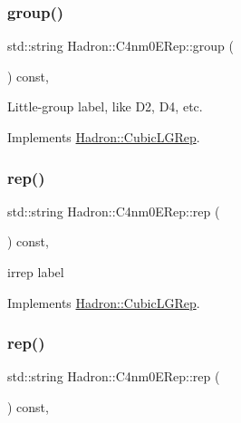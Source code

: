 \subsubsection{\texorpdfstring{group()}{group()}\hspace{0.1cm}{\footnotesize\ttfamily [2/2]}}
{\footnotesize\ttfamily std\+::string Hadron\+::\+C4nm0\+E\+Rep\+::group (\begin{DoxyParamCaption}{ }\end{DoxyParamCaption}) const\hspace{0.3cm}{\ttfamily [inline]}, {\ttfamily [virtual]}}

Little-\/group label, like D2, D4, etc. 

Implements \mbox{\hyperlink{structHadron_1_1CubicLGRep_a9bdb14b519a611d21379ed96a3a9eb41}{Hadron\+::\+Cubic\+L\+G\+Rep}}.

\mbox{\label{structHadron_1_1C4nm0ERep_a7f4628e8d080d5552176c65fcbd66e84}} 
\subsubsection{\texorpdfstring{rep()}{rep()}\hspace{0.1cm}{\footnotesize\ttfamily [1/2]}}
{\footnotesize\ttfamily std\+::string Hadron\+::\+C4nm0\+E\+Rep\+::rep (\begin{DoxyParamCaption}{ }\end{DoxyParamCaption}) const\hspace{0.3cm}{\ttfamily [inline]}, {\ttfamily [virtual]}}

irrep label 

Implements \mbox{\hyperlink{structHadron_1_1CubicLGRep_a50f5ddbb8f4be4cee0106fa9e8c75e6c}{Hadron\+::\+Cubic\+L\+G\+Rep}}.

\mbox{\label{structHadron_1_1C4nm0ERep_a7f4628e8d080d5552176c65fcbd66e84}} 
\subsubsection{\texorpdfstring{rep()}{rep()}\hspace{0.1cm}{\footnotesize\ttfamily [2/2]}}
{\footnotesize\ttfamily std\+::string Hadron\+::\+C4nm0\+E\+Rep\+::rep (\begin{DoxyParamCaption}{ }\end{DoxyParamCaption}) const\hspace{0.3cm}{\ttfamily [inline]}, {\ttfamily [virtual]}}

